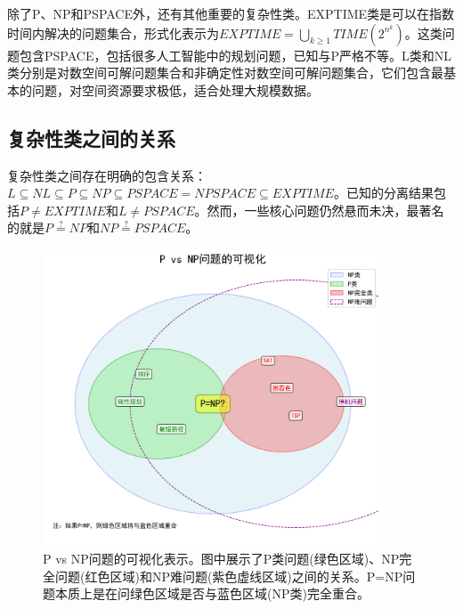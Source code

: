 \documentclass[a4paper,12pt]{ctexart}
\begin{document}
除了P、NP和PSPACE外，还有其他重要的复杂性类。EXPTIME类是可以在指数时间内解决的问题集合，形式化表示为$EXPTIME = \bigcup_{k \geq 1} TIME(2^{n^k})$。这类问题包含PSPACE，包括很多人工智能中的规划问题，已知与P严格不等。L类和NL类分别是对数空间可解问题集合和非确定性对数空间可解问题集合，它们包含最基本的问题，对空间资源要求极低，适合处理大规模数据。

\subsection{复杂性类之间的关系}
复杂性类之间存在明确的包含关系：$L \subseteq NL \subseteq P \subseteq NP \subseteq PSPACE = NPSPACE \subseteq EXPTIME$。已知的分离结果包括$P \neq EXPTIME$和$L \neq PSPACE$。然而，一些核心问题仍然悬而未决，最著名的就是$P \stackrel{?}{=} NP$和$NP \stackrel{?}{=} PSPACE$。

\begin{figure}[H]
    \centering
    \includegraphics[width=0.9\textwidth]{img/pnp_visualization.png}
    \caption{P vs NP问题的可视化表示。图中展示了P类问题(绿色区域)、NP完全问题(红色区域)和NP难问题(紫色虚线区域)之间的关系。P=NP问题本质上是在问绿色区域是否与蓝色区域(NP类)完全重合。}
    \label{fig:pnp_visualization}
\end{figure}
\end{document}
